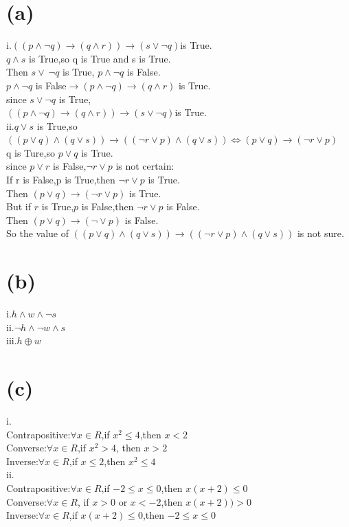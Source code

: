 \documentclass{article}
\begin{document}
\section*{(a)}
i.\(((p\land \lnot q)\longrightarrow(q\land r))\longrightarrow (s\lor \lnot q)\)is True.\\
\(q\land s\) is True,so q is True and s is True.\\
Then \(s\lor\ \lnot q\) is True, \(p\land \lnot q\) is False.\\ \(p\land \lnot q\) is False\(\longrightarrow (p\land \lnot q)\longrightarrow (q\land r)\) is True.\\since \(s \lor \lnot q\) is True,\\
\(((p\land \lnot q)\longrightarrow (q\land r))\longrightarrow (s\lor \lnot q)\)is True.\\
ii.\(q\lor s\) is True,so \(((p\lor q)\land (q\lor s))\longrightarrow ((\lnot r\lor p)\land (q\lor s))\Longleftrightarrow(p\lor q)\longrightarrow (\lnot r\lor p)\)\\
q is Ture,so \(p\lor q\) is True.\\since \(p\lor r\) is False,\(\lnot r \lor p\) is not certain:\\
If r is False,p is True,then \(\lnot r \lor p\)  is True.\\Then \((p\lor q)\longrightarrow (\lnot r \lor p)\) is True.\\But if \(r\) is True,\(p\) is False,then \(\lnot r \lor p\) is False.\\
Then \((p\lor q)\longrightarrow (\lnot \lor p)\) is False.\\So the value of \(((p\lor q)\land (q\lor s))\longrightarrow ((\lnot r\lor p)\land (q\lor s))\) is not sure.

\section*{(b)}
i.\(h\land w\land \lnot s\)\\
ii.\(\lnot h\land \lnot w\land s\)\\
iii.\(h\oplus w\)

\section*{(c)}
i.\\Contrapositive:\(\forall x\in R\),if \(x^2\le 4\),then \(x < 2\)\\
Converse:\(\forall x\in R\),if \(x^2 > 4\), then \(x > 2\)\\
Inverse:\(\forall x\in R\),if \(x\le 2\),then \(x^2\le 4\) \\
ii.\\Contrapositive:\(\forall x\in R\),if \(-2\le x\le 0\),then \(x(x+2)\le 0\)\\
Converse:\(\forall x\in R\), if \(x>0\) or \(x<-2\),then \(x(x+2))>0\)\\
Inverse:\(\forall x\in R\),if \(x(x+2)\le 0\),then \(-2\le x\le 0\)\\
\end{document}

